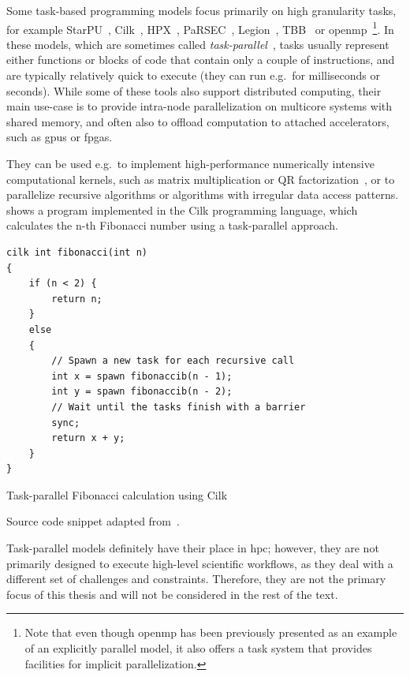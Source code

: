 Some task-based programming models focus primarily on high granularity tasks, for example
StarPU~\cite{starpu}, Cilk~\cite{cilk}, HPX~\cite{hpx},
PaRSEC~\cite{parsec}, Legion~\cite{legion}, TBB~\cite{tbb} or
\gls{openmp}~\cite{openmp}\footnote{Note that even though \gls{openmp} has been previously presented as an example of an
explicitly parallel model, it also offers a task system that provides facilities for implicit parallelization.}. In these models, which are
sometimes called \emph{task-parallel}~\cite{task_based_taxonomy}, tasks usually represent either
functions or blocks of code that contain only a couple of instructions, and are typically
relatively quick to execute (they can run e.g.\ for milliseconds or seconds). While some of these
tools also support distributed computing, their main use-case is to provide intra-node
parallelization on multicore systems with shared memory, and often also to offload computation to
attached accelerators, such as \glspl{gpu} or \glspl{fpga}.

They can be used e.g.\ to implement high-performance numerically intensive computational kernels,
such as matrix multiplication or QR factorization~\cite{qr_factorization}, or to parallelize
recursive algorithms or algorithms with irregular data access patterns. 
shows a program implemented in the Cilk programming language, which calculates the n-th Fibonacci
number using a task-parallel approach.

\begin{listing}
	\begin{verbatim}
cilk int fibonacci(int n)
{
	if (n < 2) {
		return n;
	}
	else
	{
		// Spawn a new task for each recursive call
		int x = spawn fibonaccib(n - 1);
		int y = spawn fibonaccib(n - 2);
		// Wait until the tasks finish with a barrier
		sync;
		return x + y;
	}
}
	\end{verbatim}
	\caption{Task-parallel Fibonacci calculation using Cilk}
	\centering Source code snippet adapted from~\cite{cilk}.
	\label{lst:cilk-fibonacci}
\end{listing}

Task-parallel models definitely have their place in \gls{hpc}; however, they are not
primarily designed to execute high-level scientific workflows, as they deal with a different set of
challenges and constraints. Therefore, they are not the primary focus of this thesis and will not
be considered in the rest of the text.

